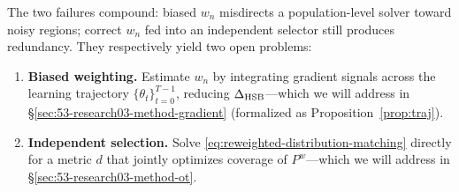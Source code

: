 \begin{foldable} %
    The two failures compound: biased $w_n$ misdirects a population-level solver toward noisy regions; correct $w_n$ fed into an independent selector still produces redundancy.
    They respectively yield two open problems:
    \begin{enumerate}[label=\textbf{(\alph*)}]
        \item \label{open-problem-weight} \textbf{Biased weighting.} Estimate $w_n$ by integrating gradient signals across the learning trajectory $\{\theta_t\}_{t=0}^{T-1}$, reducing $\Delta_\textup{HSB}$---which we will address in \S\ref{sec:53-research03-method-gradient} (formalized as Proposition~\ref{prop:traj}).
        \item \label{open-problem-select} \textbf{Independent selection.} Solve \eqref{eq:reweighted-distribution-matching} directly for a metric $d$ that jointly optimizes coverage of $P^w$---which we will address in \S\ref{sec:53-research03-method-ot}.
    \end{enumerate}
\end{foldable}